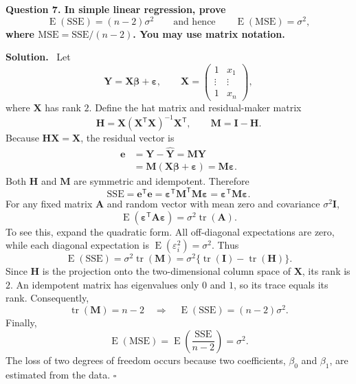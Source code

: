 \documentclass[11pt]{article}
\newcommand{\E}{\operatorname{E}}
\newcommand{\tr}{\operatorname{tr}}
\newenvironment{question}
  {\par\medskip\noindent\color{navy}\bfseries}
  {\par\medskip\color{black}}
\newenvironment{solution}
  {\noindent\color{darkgreen}\textbf{Solution.}\color{black}\ }
  {\hfill$\square$\par\medskip}
\begin{document}
\begin{question}
Question 7. In simple linear regression, prove
\[
  \boxed{\E(\mathrm{SSE})=(n-2)\sigma^2}
  \qquad\text{and hence}\qquad
  \boxed{\E(\mathrm{MSE})=\sigma^2},
\]
where $\mathrm{MSE}=\mathrm{SSE}/(n-2)$. You may use matrix notation.
\end{question}

\begin{solution}
Let
\[
 \mathbf Y=\mathbf X\boldsymbol\beta+\boldsymbol\varepsilon,
 \qquad
 \mathbf X=
 \begin{pmatrix}
 1&x_1\\ \vdots&\vdots\\1&x_n
 \end{pmatrix},
\]
where $\mathbf X$ has rank $2$. Define the hat matrix and residual-maker
matrix
\[
 \mathbf H=\mathbf X(\mathbf X^{\mathsf T}\mathbf X)^{-1}
              \mathbf X^{\mathsf T},
 \qquad
 \mathbf M=\mathbf I-\mathbf H.
\]
Because $\mathbf H\mathbf X=\mathbf X$, the residual vector is
\begin{align*}
 \mathbf e
 &=\mathbf Y-\widehat{\mathbf Y}
 =\mathbf M\mathbf Y\\
 &=\mathbf M(\mathbf X\boldsymbol\beta+\boldsymbol\varepsilon)
 =\mathbf M\boldsymbol\varepsilon.
\end{align*}
Both $\mathbf H$ and $\mathbf M$ are symmetric and idempotent. Therefore
\[
 \mathrm{SSE}=\mathbf e^{\mathsf T}\mathbf e
 =\boldsymbol\varepsilon^{\mathsf T}\mathbf M^{\mathsf T}
  \mathbf M\boldsymbol\varepsilon
 =\boldsymbol\varepsilon^{\mathsf T}\mathbf M\boldsymbol\varepsilon.
\]
For any fixed matrix $\mathbf A$ and random vector with mean zero and
covariance $\sigma^2\mathbf I$,
\[
 \E(\boldsymbol\varepsilon^{\mathsf T}\mathbf A
       \boldsymbol\varepsilon)
 =\sigma^2\tr(\mathbf A).
\]
To see this, expand the quadratic form. All off-diagonal expectations are
zero, while each diagonal expectation is $\E(\varepsilon_i^2)=\sigma^2$.
Thus
\[
 \E(\mathrm{SSE})=\sigma^2\tr(\mathbf M)
 =\sigma^2\{\tr(\mathbf I)-\tr(\mathbf H)\}.
\]
Since $\mathbf H$ is the projection onto the two-dimensional column space of
$\mathbf X$, its rank is $2$. An idempotent matrix has eigenvalues only $0$
and $1$, so its trace equals its rank. Consequently,
\[
 \tr(\mathbf M)=n-2
 \quad\Longrightarrow\quad
 \E(\mathrm{SSE})=(n-2)\sigma^2.
\]
Finally,
\[
 \E(\mathrm{MSE})
 =\E\left(\frac{\mathrm{SSE}}{n-2}\right)
 =\sigma^2.
\]
The loss of two degrees of freedom occurs because two coefficients,
$\beta_0$ and $\beta_1$, are estimated from the data.
\end{solution}
\end{document}
